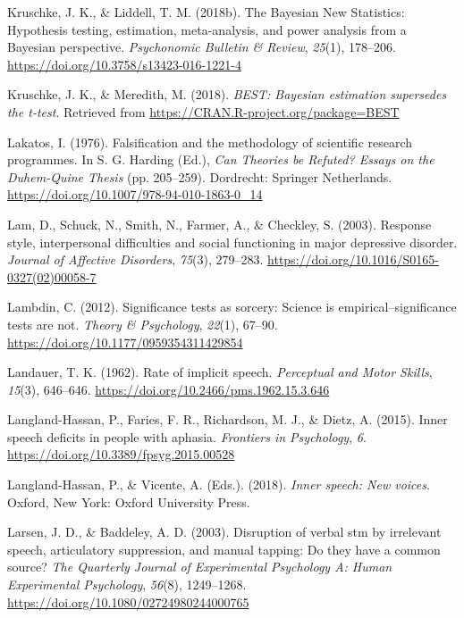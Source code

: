 \documentclass[a4paper,12pt,twoside,onecolumn,openright,final,oldfontcommands]{memoir}
\begin{document}
\leavevmode\hypertarget{ref-kruschke_bayesian_2018-1}{}%
Kruschke, J. K., \& Liddell, T. M. (2018b). The Bayesian New Statistics: Hypothesis testing, estimation, meta-analysis, and power analysis from a Bayesian perspective. \emph{Psychonomic Bulletin \& Review}, \emph{25}(1), 178--206. \url{https://doi.org/10.3758/s13423-016-1221-4}

\leavevmode\hypertarget{ref-R-BEST}{}%
Kruschke, J. K., \& Meredith, M. (2018). \emph{BEST: Bayesian estimation supersedes the t-test}. Retrieved from \url{https://CRAN.R-project.org/package=BEST}

\leavevmode\hypertarget{ref-lakatos_falsification_1976}{}%
Lakatos, I. (1976). Falsification and the methodology of scientific research programmes. In S. G. Harding (Ed.), \emph{Can Theories be Refuted? Essays on the Duhem-Quine Thesis} (pp. 205--259). Dordrecht: Springer Netherlands. \url{https://doi.org/10.1007/978-94-010-1863-0_14}

\leavevmode\hypertarget{ref-lam_response_2003}{}%
Lam, D., Schuck, N., Smith, N., Farmer, A., \& Checkley, S. (2003). Response style, interpersonal difficulties and social functioning in major depressive disorder. \emph{Journal of Affective Disorders}, \emph{75}(3), 279--283. \url{https://doi.org/10.1016/S0165-0327(02)00058-7}

\leavevmode\hypertarget{ref-Lambdin2012}{}%
Lambdin, C. (2012). Significance tests as sorcery: Science is empirical--significance tests are not. \emph{Theory \& Psychology}, \emph{22}(1), 67--90. \url{https://doi.org/10.1177/0959354311429854}

\leavevmode\hypertarget{ref-landauer_rate_1962}{}%
Landauer, T. K. (1962). Rate of implicit speech. \emph{Perceptual and Motor Skills}, \emph{15}(3), 646--646. \url{https://doi.org/10.2466/pms.1962.15.3.646}

\leavevmode\hypertarget{ref-langland-hassan_inner_2015}{}%
Langland-Hassan, P., Faries, F. R., Richardson, M. J., \& Dietz, A. (2015). Inner speech deficits in people with aphasia. \emph{Frontiers in Psychology}, \emph{6}. \url{https://doi.org/10.3389/fpsyg.2015.00528}

\leavevmode\hypertarget{ref-langland-hassan_inner_2018}{}%
Langland-Hassan, P., \& Vicente, A. (Eds.). (2018). \emph{Inner speech: New voices}. Oxford, New York: Oxford University Press.

\leavevmode\hypertarget{ref-larsen_disruption_2003}{}%
Larsen, J. D., \& Baddeley, A. D. (2003). Disruption of verbal stm by irrelevant speech, articulatory suppression, and manual tapping: Do they have a common source? \emph{The Quarterly Journal of Experimental Psychology A: Human Experimental Psychology}, \emph{56}(8), 1249--1268. \url{https://doi.org/10.1080/02724980244000765}
\end{document}
